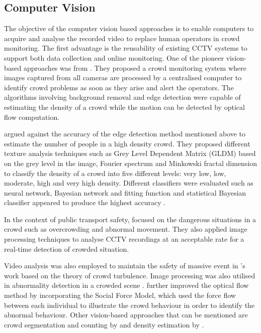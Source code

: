 \subsection{Computer Vision}
The objective of the computer vision based approaches is to enable computers to acquire and analyse the recorded video to replace human operators in crowd monitoring. The first advantage is the reusability of existing CCTV systems to support both data collection and online monitoring. One of the pioneer vision-based approaches was from \textcite{Davies1995}. They proposed a crowd monitoring system where images captured from all cameras are processed by a centralised computer to identify crowd problems as soon as they arise and alert the operators. The algorithms involving background removal and edge detection were capable of estimating the density of a crowd while the motion can be detected by optical flow computation.

\textcite{Marana1997} argued against the accuracy of the edge detection method mentioned above to estimate the number of people in a high density crowd. They proposed different texture analysis techniques such as Grey Level Dependent Matrix (GLDM) based on the grey level in the image, Fourier spectrum and Minkowski fractal dimension \parencite{Marana1999} to classify the density of a crowd into five different levels: very low, low, moderate, high and very high density. Different classifiers were evaluated such as neural network, Bayesian network and fitting function and statistical Bayesian classifier appeared to produce the highest accuracy \parencite{Marana1998}.

In the context of public transport safety, \textcite{Velastin1999} focused on the dangerous situations in a crowd such as overcrowding and abnormal movement. They also applied image processing techniques to analyse CCTV recordings at an acceptable rate for a real-time detection of crowded situation.

Video analysis was also employed to maintain the safety of massive event in \textcite{Johansson2008}’s work based on the theory of crowd turbulence. Image processing was also utilised in abnormality detection in a crowded scene \parencite{Mahadevan2010, Mehran2009}. \textcite{Mehran2009} further improved the optical flow method by incorporating the Social Force Model, which used the force flow between each individual to illustrate the crowd behaviour in order to identify the abnormal behaviour. Other vision-based approaches that can be mentioned are crowd segmentation and counting by \textcite{Chan2008} and density estimation by \textcite{Li2010}.

